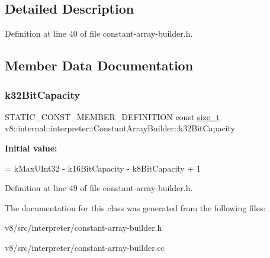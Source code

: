 \subsection{Detailed Description}


Definition at line 40 of file constant-\/array-\/builder.\+h.



\subsection{Member Data Documentation}
\mbox{\label{classv8_1_1internal_1_1interpreter_1_1ConstantArrayBuilder_a654feea91715a8a137f1fe884f599139}} 
\subsubsection{\texorpdfstring{k32\+Bit\+Capacity}{k32BitCapacity}}
{\footnotesize\ttfamily S\+T\+A\+T\+I\+C\+\_\+\+C\+O\+N\+S\+T\+\_\+\+M\+E\+M\+B\+E\+R\+\_\+\+D\+E\+F\+I\+N\+I\+T\+I\+ON const \mbox{\hyperlink{classsize__t}{size\+\_\+t}} v8\+::internal\+::interpreter\+::\+Constant\+Array\+Builder\+::k32\+Bit\+Capacity\hspace{0.3cm}{\ttfamily [static]}}

{\bfseries Initial value\+:}
\begin{DoxyCode}
=
      kMaxUInt32 - k16BitCapacity - k8BitCapacity + 1
\end{DoxyCode}


Definition at line 49 of file constant-\/array-\/builder.\+h.



The documentation for this class was generated from the following files\+:\begin{DoxyCompactItemize}
\item 
v8/src/interpreter/constant-\/array-\/builder.\+h\item 
v8/src/interpreter/constant-\/array-\/builder.\+cc\end{DoxyCompactItemize}
